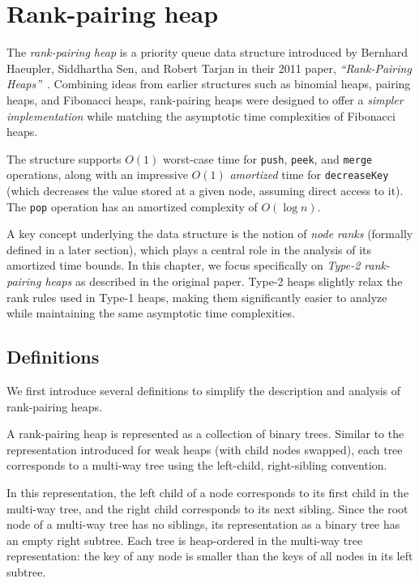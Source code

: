 \section{Rank-pairing heap}

The \emph{rank-pairing heap} is a priority queue data structure introduced by Bernhard Haeupler, Siddhartha Sen, and Robert Tarjan in their 2011 paper, \emph{``Rank-Pairing Heaps''}~\cite{HaeuplerSenTarjan2011}. Combining ideas from earlier structures such as binomial heaps, pairing heaps, and Fibonacci heaps, rank-pairing heaps were designed to offer a \emph{simpler implementation} while matching the asymptotic time complexities of Fibonacci heaps.

The structure supports \(O(1)\) worst-case time for \texttt{push}, \texttt{peek}, and \texttt{merge} operations, along with an impressive \(O(1)\) \emph{amortized} time for \texttt{decreaseKey} (which decreases the value stored at a given node, assuming direct access to it). The \texttt{pop} operation has an amortized complexity of \(O(\log n)\).

A key concept underlying the data structure is the notion of \emph{node ranks} (formally defined in a later section), which plays a central role in the analysis of its amortized time bounds. In this chapter, we focus specifically on \emph{Type-2 rank-pairing heaps} as described in the original paper. Type-2 heaps slightly relax the rank rules used in Type-1 heaps, making them significantly easier to analyze while maintaining the same asymptotic time complexities.

\subsection{Definitions}

We first introduce several definitions to simplify the description and analysis of rank-pairing heaps.

A rank-pairing heap is represented as a collection of binary trees. Similar to the representation introduced for weak heaps (with child nodes swapped), each tree corresponds to a multi-way tree using the left-child, right-sibling convention.

In this representation, the left child of a node corresponds to its first child in the multi-way tree, and the right child corresponds to its next sibling. Since the root node of a multi-way tree has no siblings, its representation as a binary tree has an empty right subtree. Each tree is heap-ordered in the multi-way tree representation: the key of any node is smaller than the keys of all nodes in its left subtree.

